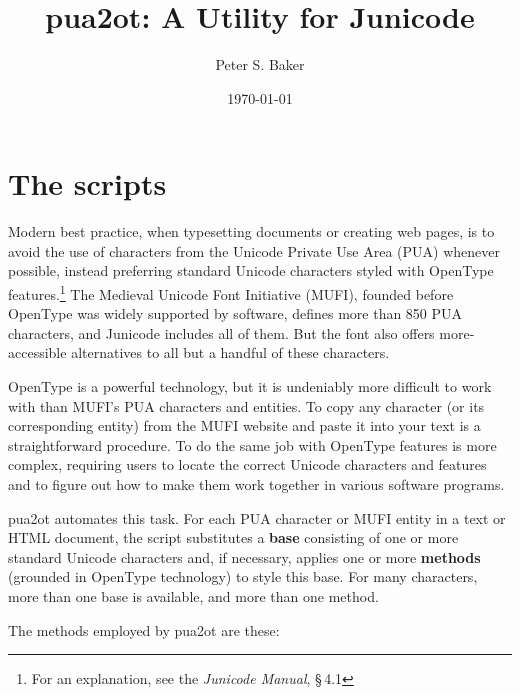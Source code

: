 \documentclass[12pt,letterpaper,openany]{article}
\title{pua2ot: A Utility for Junicode}
\author{Peter S. Baker}
\date{\today}
\newcommand{\pto}{\textsf{\color{myLightPurple}pua2ot}}
\begin{document}
\maketitle

\section{The scripts}

Modern best practice, when typesetting documents or creating web pages, is to
avoid the use of characters from the Unicode Private Use Area (PUA) whenever
possible, instead preferring standard Unicode characters styled with OpenType
features.\footnote{For an explanation, see the \textit{Junicode Manual}, §\,4.1} 
The Medieval Unicode Font Initiative (MUFI), founded before OpenType
was widely supported by software, defines more than 850 PUA characters, and
Junicode includes all of them. But the font also offers more-accessible 
alternatives to all but a handful of these characters.

OpenType is a powerful technology, but it is undeniably more difficult 
to work with than MUFI’s PUA characters and entities. To copy any character (or its 
corresponding entity) from the MUFI website and paste it into your text is a 
straightforward procedure. To do the same job with OpenType features is more 
complex, requiring users to locate the correct Unicode characters
and features and to figure out how to make them work together in various software 
programs.

{\pto} automates this task. For each PUA character or MUFI entity in a 
text or HTML document, the script substitutes a \textbf{base} consisting of 
one or more standard Unicode characters and, if necessary, applies one or 
more \textbf{methods} (grounded in OpenType technology) to style this base. For 
many characters, more than one base is available, and more than one method.

The methods employed by {\pto} are these:
\end{document}
